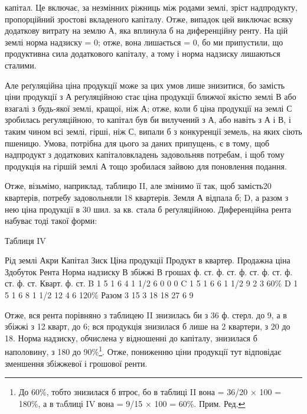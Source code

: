 \parcont{}  %
капітал. Це включає, за незмінних ріжниць між родами землі, зріст надпродукту,
пропорційний зростові вкладеного капіталу. Отже, випадок цей виключає всяку
додаткову витрату на землю А, яка вплинула б на диференційну ренту. На цій землі
норма надзиску = 0; отже, вона лишається = 0, бо ми припустили, що продуктивна
сила додаткового капіталу, а тому і норма надзиску лишаються сталими.

Але реґуляційна ціна продукції може за цих умов лише знизитися, бо замість
ціни продукції з А реґуляційною стає ціна продукції ближчої якістю землі
В або взагалі з будь-якої землі, кращої, ніж А; отже, коли б ціна продукції
на землі С зробилась регуляційною, то капітал був би вилучений з А,
або навіть з А і В, і таким чином всі землі, гірші, ніж С, випали б з конкуренції
земель, на яких сіють пшеницю. Умова, потрібна для цього за даних
припущень, є в тому, щоб надпродукт з додаткових капіталовкладень задовольняв
потребам, і щоб тому продукція на гіршій землі А тощо зробилася
зайвою для поновлення подання.

Отже, візьмімо, наприклад, таблицю II, але змінимо її так, щоб замість20
квартерів, потребу задовольняли 18 квартерів. Земля А відпала б; D, а
разом з нею ціна продукції в 30 шил. за кв. стала б реґуляційною. Диференційна
рента набуває тоді такої форми:

Таблиця IV

Рід землі    Акри    Капітал    Зиск    Ціна продукції
Продукт в квартер. Продажна ціна    Здобуток    Рента    Норма надзиску
                                В збіжжі    В грошах
     ф. ст. ф. ст. ф. ст. ф. ст. ф. ст. ф. ст. Кварт. ф. ст.
B    1    5    1    6    4    1 1/2    6    0    0    0
C    1    5    1    6    6    1 1/2    9    2    3    60\%
D    1    5    1    6    8    1 1/2    12    4    6    120\%
 Разом    3    15    3    18    18        27    6    9

Отже, вся рента порівняно з таблицею II знизилась би з 36 ф. стерл.
до 9, а в збіжжі з 12 кварт, до 6; вся продукція знизилася б лише на 2
квартери, з 20 до 18. Норма надзиску, обчислена у відношенні до капіталу,
знизилася б наполовину, з 180 до 90\%\footnote*{
До 60\%, тобто знизилася б втроє, бо в таблиці II вона = 36/20 × 100 = 180\%, а в тaблиці
IV вона = 9/15 × 100 = 60\%. Прим. Ред.
}. Отже, пониженню ціни продукції
тут відповідає зменшення збіжжевої і грошової ренти.

